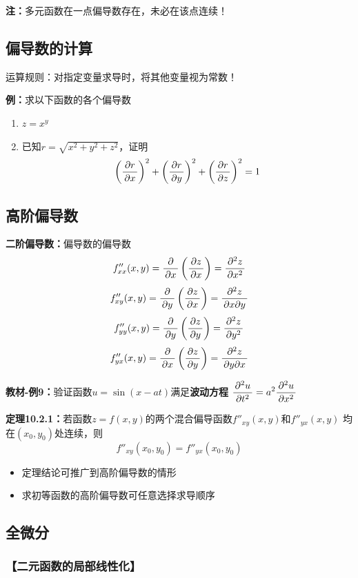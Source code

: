 {\bf 注：}多元函数在一点偏导数存在，未必在该点连续！

\subsection{偏导数的计算}

运算规则：对指定变量求导时，将其他变量视为常数！

{\bf 例：}求以下函数的各个偏导数
\begin{enumerate}[(1)]
  \setlength{\itemindent}{1cm}
  \item $z=x^y$
  \item 已知$r=\sqrt{x^2+y^2+z^2}$，证明
	$$\left(\df{\p r}{\p x}\right)^2+\left(\df{\p r}{\p y}\right)^2+\left(\df{\p
	r}{\p z}\right)^2=1$$
\end{enumerate}

\subsection{高阶偏导数}

{\bf 二阶偏导数：}偏导数的偏导数 
$${f''_{xx}(x,y)=\df{\p}{\p x}\left(\df{\p z}{\p x}\right)
=\df{\p^2 z}{\p x^2}}$$ 
$${f''_{xy}(x,y)=\df{\p}{\p y}\left(\df{\p z}{\p x}\right)
=\df{\p^2 z}{\p x\p y}}$$ 
$${f''_{yy}(x,y)=\df{\p}{\p y}\left(\df{\p z}{\p y}\right)
=\df{\p^2 z}{\p y^2}}$$ 
$${f''_{yx}(x,y)=\df{\p}{\p x}\left(\df{\p z}{\p y}\right)
=\df{\p^2 z}{\p y\p x}}$$

{\bf 教材-例9：}验证函数$u=\sin(x-at)$满足{\bf 波动方程}
$\df{\p^2u}{\p t^2}=a^2\df{\p^2u}{\p x^2}$

{\bf 定理10.2.1：}若函数$z=f(x,y)$的两个混合偏导函数$f''_{xy}(x,y)$和$f''_{yx}(x,y)$
均在$(x_0,y_0)$处连续，则
$$f''_{xy}(x_0,y_0)=f''_{yx}(x_0,y_0)$$

\begin{itemize}
  \item 定理结论可推广到高阶偏导数的情形
  \item 求初等函数的高阶偏导数可任意选择求导顺序
\end{itemize}

\subsection{全微分}

\subsubsection{【二元函数的局部线性化】}

